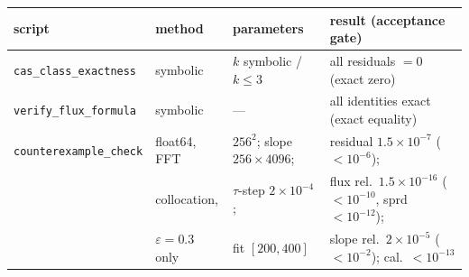 \documentclass[11pt]{amsart}
\theoremstyle{definition}
\theoremstyle{remark}
\begin{document}
\begin{center}\footnotesize\setlength{\tabcolsep}{3pt}
\begin{tabular}{@{}llll@{}}
script & method & parameters & result (acceptance gate)\\
\hline
\texttt{cas\_class\_exactness} & symbolic & $k$ symbolic / $k\le3$ & all residuals $=0$ (exact zero)\\
\texttt{verify\_flux\_formula} & symbolic & --- & all identities exact (exact equality)\\
\texttt{counterexample\_check} & float64, FFT & $256^2$; slope $256\times4096$; & residual $1.5\times10^{-7}$ ($<10^{-6}$);\\
 & collocation, & $\tau$-step $2\times10^{-4}$; & flux rel.\ $1.5\times10^{-16}$ ($<10^{-10}$, sprd $<10^{-12}$);\\
 & $\varepsilon=0.3$ only & fit $[200,400]$ & slope rel.\ $2\times10^{-5}$ ($<10^{-2}$); cal.\ $<10^{-13}$\\
\end{tabular}\end{center}
\end{document}
